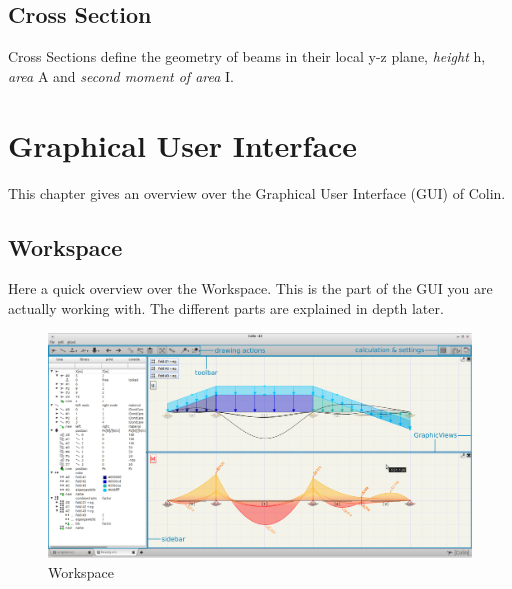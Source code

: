 \documentclass[a4paper,11pt]{report}
\begin{document}
\section{Cross Section}
Cross Sections define the geometry of beams in their local y-z plane,  \textit{height} h, \textit{area} A and \textit{second moment of area} I.

\chapter{Graphical User Interface}

This chapter gives an overview over the Graphical User Interface (GUI) of Colin.

\section{Workspace}
\label{sec:workspace}

Here a quick overview over the Workspace. This is the part of the GUI you are actually working with. The different parts are explained in depth later.
\begin{figure}[H]
\includegraphics[width=\textwidth]{./pictures/workspace_overlay.png}
\caption{Workspace}
\label{pic:workspace}
\end{figure}
\end{document}
